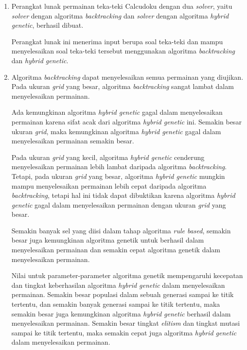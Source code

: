 \begin{enumerate}
\item Perangkat lunak permainan teka-teki Calcudoku dengan dua \textit{solver}, yaitu \textit{solver} dengan algoritma \textit{backtracking} dan \textit{solver} dengan algoritma \textit{hybrid genetic}, berhasil dibuat.

Perangkat lunak ini menerima input berupa soal teka-teki dan mampu menyelesaikan soal teka-teki tersebut menggunakan algoritma \textit{backtracking} dan \textit{hybrid genetic}.

\item Algoritma \textit{backtracking} dapat menyelesaikan semua permainan yang diujikan. Pada ukuran \textit{grid} yang besar, algoritma \textit{backtracking} sangat lambat dalam menyelesaikan permainan.

Ada kemungkinan algoritma \textit{hybrid genetic} gagal dalam menyelesaikan permainan karena sifat acak dari algoritma \textit{hybrid genetic} ini. Semakin besar ukuran \textit{grid}, maka kemungkinan algoritma \textit{hybrid genetic} gagal dalam menyelesaikan permainan semakin besar.

Pada ukuran \textit{grid} yang kecil, algoritma \textit{hybrid genetic} cenderung menyelesaikan permainan lebih lambat daripada algoritma \textit{backtracking}. Tetapi, pada ukuran \textit{grid} yang besar, algoritma \textit{hybrid genetic} mungkin mampu menyelesaikan permainan lebih cepat daripada algoritma \textit{backtracking}, tetapi hal ini tidak dapat dibuktikan karena algoritma \textit{hybrid genetic} gagal dalam menyelesaikan permainan dengan ukuran \textit{grid} yang besar.

Semakin banyak sel yang diisi dalam tahap algoritma \textit{rule based}, semakin besar juga kemungkinan algoritma genetik untuk berhasil dalam menyelesaikan permainan dan semakin cepat algoritma genetik dalam menyelesaikan permainan.

Nilai untuk parameter-parameter algoritma genetik mempengaruhi kecepatan dan tingkat keberhasilan algoritma \textit{hybrid genetic} dalam menyelesaikan permainan. Semakin besar populasi dalam sebuah generasi sampai ke titik tertentu, dan semakin banyak generasi sampai ke titik tertentu, maka semakin besar juga kemungkinan algoritma \textit{hybrid genetic} berhasil dalam menyelesaikan permainan. Semakin besar tingkat \textit{elitism} dan tingkat mutasi sampai ke titik tertentu, maka semakin cepat juga algoritma \textit{hybrid genetic} dalam menyelesaikan permainan.
\end{enumerate}

